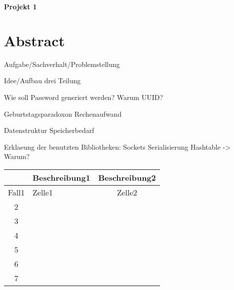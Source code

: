 \documentclass[a4paper,12pt]{article}
\begin{document}
\begin{center}
\Large
\textbf{Projekt 1}
\end{center}

\newpage
\tableofcontents
\newpage
\setcounter{tocdepth}{2}

\section{Abstract}

Aufgabe/Sachverhalt/Problemstellung

Idee/Aufbau
drei Teilung

Wie soll Password generiert werden?
Warum UUID?

Geburtstagsparadoxon
Rechenaufwand

Datenstruktur
Speicherbedarf

Erklaeung der benutzten Bibliotheken:
Sockets
Serialisierung
Hashtable -> Warum?

\begin{tabular} [h] {||c|l|c||} 
\hline \rule[-1.5mm]{0pt}{5.5ex} & \normalsize Beschreibung1 & Beschreibung2 \\ 
\hline
\hline \rule[-1.5mm]{0pt}{5.5ex} Fall1 & Zelle1 & Zelle2 \\ 
\hline \rule[-1.5mm]{0pt}{5.5ex} 2 &  & \\ 
\hline \rule[-1.5mm]{0pt}{5.5ex} 3 &  & \\ 
\hline \rule[-1.5mm]{0pt}{5.5ex} 4 &  & \\ 
\hline \rule[-1.5mm]{0pt}{5.5ex} 5 &  & \\ 
\hline \rule[-1.5mm]{0pt}{5.5ex} 6 &  & \\ 
\hline \rule[-1.5mm]{0pt}{5.5ex} 7 &  & \\ 
\hline
\end{tabular}
\end{document}
